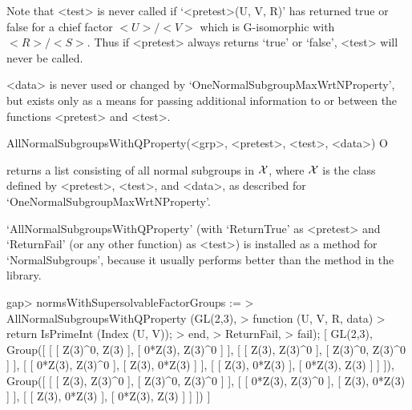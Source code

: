 Note that <test> is never called if `<pretest>(U, V, R)' has returned true or
false for a chief factor $<U>/<V>$ which is G-isomorphic with $<R>/<S>$.
Thus if <pretest> always returns `true' or `false', <test> will never be
called.

<data> is never used or changed by `OneNormalSubgroupMaxWrtNProperty', but
exists only as a means for passing additional information to or between
the functions <pretest> and <test>.


\>AllNormalSubgroupsWithQProperty(<grp>, <pretest>, <test>, <data>) O

returns a list consisting of all normal subgroups in $\cal X$, where $\cal
X$ is the class defined by <pretest>, <test>, and <data>, as described for
`OneNormalSubgroupMaxWrtNProperty'. 

%
`AllNormalSubgroupsWithQProperty' (with `ReturnTrue' as
<pretest> and `ReturnFail' (or any other function) as <test>) is installed as a method for
`NormalSubgroups', because it usually performs better than the method in the
{\GAP} library.

\beginexample
gap> normsWithSupersolvableFactorGroups :=
> AllNormalSubgroupsWithQProperty (GL(2,3),
> function (U, V, R, data)
> return IsPrimeInt (Index (U, V));
> end,
> ReturnFail,
> fail);
[ GL(2,3), 
  Group([ [ [ Z(3)^0, Z(3) ], [ 0*Z(3), Z(3)^0 ] ], [ [ Z(3), Z(3)^0 ], 
          [ Z(3)^0, Z(3)^0 ] ], [ [ 0*Z(3), Z(3)^0 ], [ Z(3), 0*Z(3) ] ], 
      [ [ Z(3), 0*Z(3) ], [ 0*Z(3), Z(3) ] ] ]), 
  Group([ [ [ Z(3), Z(3)^0 ], [ Z(3)^0, Z(3)^0 ] ], 
      [ [ 0*Z(3), Z(3)^0 ], [ Z(3), 0*Z(3) ] ], 
      [ [ Z(3), 0*Z(3) ], [ 0*Z(3), Z(3) ] ] ]) ]
\endexample



